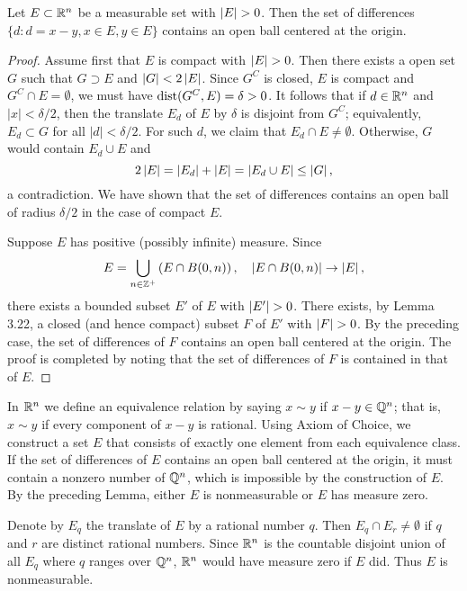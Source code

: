 \begin{lemma}
  Let $E \subset \mathbb{R}^n$ be a measurable set with $\left\vert E\right\vert > 0$.
  Then the set of differences
  $\{d : d = x-y, x \in E, y \in E\}$
  contains an open ball centered at the origin.
\end{lemma}
\begin{proof}
  Assume first that $E$ is compact with $\left\vert E\right\vert > 0$.
  Then there exists a open set $G$ such that
  $G \supset E$ and $\left\vert G\right\vert < 2 \left\vert E\right\vert$.
  Since $G^C$ is closed, $E$ is compact and $G^C \cap E = \emptyset$,
  we must have $\operatorname{dist}(G^C, E) = \delta > 0$.
  It follows that if $d \in \mathbb{R}^n$ and $|x| < \delta/2$,
  then the translate $E_{d}$ of $E$ by $\delta$ is disjoint from $G^C$;
  equivalently, $E_{d} \subset G$ for all $|d| < \delta/2$.
  For such $d$, we claim that $E_{d} \cap E \neq \emptyset$.
  Otherwise, $G$ would contain $E_{d} \cup E$ and
  \[
    2 \left\vert E\right\vert = \left\vert E_d\right\vert + \left\vert E\right\vert = \left\vert E_d \cup E\right\vert \le \left\vert G\right\vert,
  \]
  a contradiction.
  We have shown that the set of differences
  contains an open ball of radius $\delta/2$
  in the case of compact $E$.

  Suppose $E$ has positive (possibly infinite) measure.
  Since
  \[
    E = \bigcup_{n \in \mathbb{Z}^+} \left( E \cap B(0, n) \right), \quad
    \left\vert E \cap B(0,n)\right\vert \rightarrow \left\vert E\right\vert,
  \]
  there exists a bounded subset $E'$ of $E$ with $\left\vert E'\right\vert > 0$.
  There exists, by Lemma 3.22,
  a closed (and hence compact) subset $F$ of $E'$ with $\left\vert F\right\vert > 0$.
  By the preceding case, the set of differences of $F$
  contains an open ball centered at the origin.
  The proof is completed by noting that
  the set of differences of $F$ is contained in that of $E$.
\end{proof}

\begin{exercise}{3.19}
  In $\mathbb{R}^n$ we define an equivalence relation by saying
  $x \sim y$ if $x - y \in \mathbb{Q}^n$;
  that is, $x \sim y$ if every component of $x-y$ is rational.
  Using Axiom of Choice,
  we construct a set $E$ that consists of exactly one element
  from each equivalence class.
  If the set of differences of $E$ contains an open ball centered at the origin,
  it must contain a nonzero number of $\mathbb{Q}^n$,
  which is impossible by the construction of $E$.
  By the preceding Lemma,
  either $E$ is nonmeasurable or $E$ has measure zero.

  Denote by $E_q$ the translate of $E$ by a rational number $q$.
  Then $E_q \cap E_r \neq \emptyset$ if $q$ and $r$ are distinct rational numbers.
  Since $\mathbb{R}^n$ is the countable disjoint union of all $E_q$
  where $q$ ranges over $\mathbb{Q}^n$,
  $\mathbb{R}^n$ would have measure zero if $E$ did.
  Thus $E$ is nonmeasurable.
\end{exercise}

